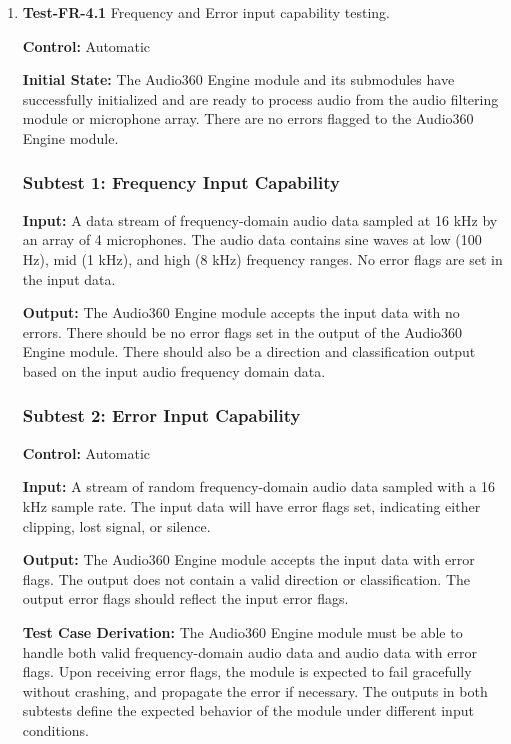 \documentclass[12pt, titlepage]{article}
\begin{document}
\begin{enumerate}
\item{\textbf{Test-FR-4.1} Frequency and Error input capability testing.\\}

\textbf{Control:} Automatic

\textbf{Initial State:}
The Audio360 Engine module and its submodules have successfully initialized and
are ready to process audio from the audio filtering module or microphone array.
There are no errors flagged to the Audio360 Engine module.

\subsubsection*{Subtest 1: Frequency Input Capability}
\textbf{Input:}
A data stream of frequency-domain audio data sampled at 16 kHz by an array of 4
microphones. The audio data contains sine waves at low (100 Hz), mid (1 kHz),
and high (8 kHz) frequency ranges. No error flags are set in the input data.

\textbf{Output:}
The Audio360 Engine module accepts the input data with no errors. There should
be no error flags set in the output of the Audio360 Engine module. There should
also be a direction and classification output based on the input audio frequency
domain data.

\subsubsection*{Subtest 2: Error Input Capability}

\textbf{Control:} Automatic

\textbf{Input:}
A stream of random frequency-domain audio data sampled with a 16 kHz sample
rate. The input data will have error flags set, indicating either clipping, lost
signal, or silence.

\textbf{Output:}
The Audio360 Engine module accepts the input data with error flags. The output
does not contain a valid direction or classification. The output error flags
should reflect the input error flags.

\textbf{Test Case Derivation:}
The Audio360 Engine module must be able to handle both valid frequency-domain
audio data and audio data with error flags. Upon receiving error flags, the
module is expected to fail gracefully without crashing, and propagate the error
if necessary. The outputs in both subtests define the expected behavior of the
module under different input conditions.


\end{enumerate}
\end{document}
